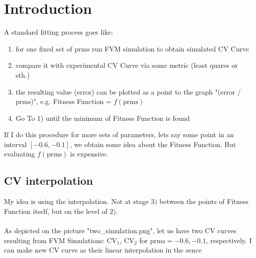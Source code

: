\documentclass{article}
\numberwithin{equation}{section}
\def\prms{\text{prms}}
\def\CVone{\text{CV}_1}
\def\CVtwo{\text{CV}_2}
\begin{document}




\section{Introduction}
A standard fitting process goes like:
\begin{enumerate}
\item for one fixed set of $\prms$ run FVM simulation to obtain simulated CV Curve
\item compare it with experimental CV Curve via some metric (least quares or sth.)
\item the resulting value (error) can be plotted as a point to the graph "(error / $\prms$)", e.g. Fitness Function = $f(\prms)$
\item Go To 1) until the minimum of Fitness Function is found
\end{enumerate}

If I do this procedure for more sets of parameters, lets say some point in an interval $[-0.6 , -0.1]$, we obtain some idea about the Fitness Function. But evaluating $f(\prms)$ is expensive.

\subsection{CV interpolation}
My idea is using the interpolation. Not at stage $3)$ between the points of Fitness Function itself, but on the level of $2)$. 
\\
\\
As depicted on the picture "two\_simulation.png", let us have two CV curves resulting from FVM Simulations: $\CVone$, $\CVtwo$ for $\prms = -0.6, -0.1$, respectively. I can make new CV curve as their linear interpolation in the sence
\end{document}
